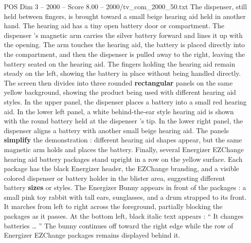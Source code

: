 \begin{textsample}{POS Dim 3 – 2000 – Score 8.00 – 2000/tv\_com\_2000\_50.txt}
The dispenser, still held between fingers, is brought toward a small beige hearing aid held in another hand.
The hearing aid has a tiny open battery door or compartment.
The dispenser ’s magnetic arm carries the silver battery forward and lines it up with the opening.
The arm touches the hearing aid, the battery is placed directly into the compartment, and then the dispenser is pulled away to the right, leaving the battery seated on the hearing aid.
The fingers holding the hearing aid remain steady on the left, showing the battery in place without being handled directly.
The screen then divides into three rounded \textbf{rectangular} panels on the same yellow background, showing the product being used with different hearing aid styles.
In the upper panel, the dispenser places a battery into a small red hearing aid.
In the lower left panel, a white behind-the-ear style hearing aid is shown with the round battery held at the dispenser ’s tip.
In the lower right panel, the dispenser aligns a battery with another small beige hearing aid.
The panels \textbf{simplify} the demonstration : different hearing aid shapes appear, but the same magnetic arm holds and places the battery.
Finally, several Energizer EZChange hearing aid battery packages stand upright in a row on the yellow surface.
Each package has the black Energizer header, the EZChange branding, and a visible colored dispenser or battery holder in the blister area, suggesting different battery \textbf{sizes} or styles.
The Energizer Bunny appears in front of the packages : a small pink toy rabbit with tall ears, sunglasses, and a drum strapped to its front.
It marches from left to right across the foreground, partially blocking the packages as it passes.
At the bottom left, black italic text appears : “ It changes batteries … ” The bunny continues off toward the right edge while the row of Energizer EZChange packages remains displayed behind it.

\end{textsample}
